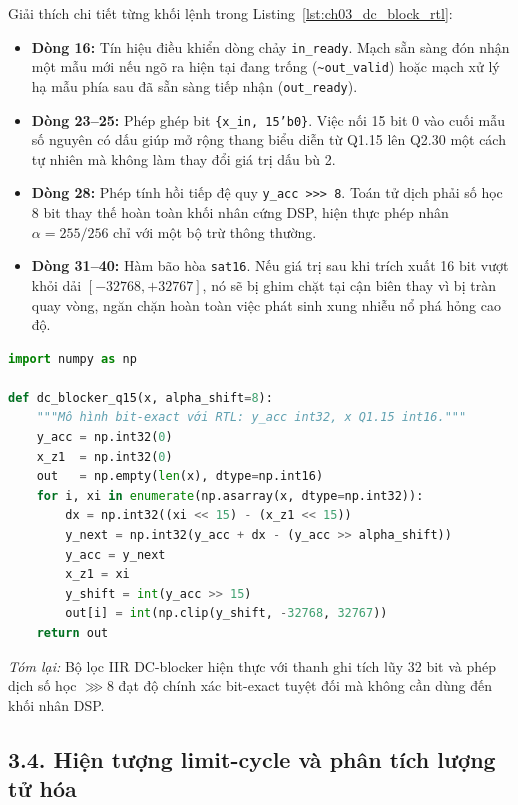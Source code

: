 Giải thích chi tiết từng khối lệnh trong Listing~\ref{lst:ch03_dc_block_rtl}:
\begin{itemize}
    \item \textbf{Dòng 16:} Tín hiệu điều khiển dòng chảy \texttt{in\_ready}. Mạch sẵn sàng đón nhận một mẫu mới nếu ngõ ra hiện tại đang trống (\texttt{\textasciitilde out\_valid}) hoặc mạch xử lý hạ mẫu phía sau đã sẵn sàng tiếp nhận (\texttt{out\_ready}).
    \item \textbf{Dòng 23--25:} Phép ghép bit \texttt{\{x\_in, 15'b0\}}. Việc nối 15 bit 0 vào cuối mẫu số nguyên có dấu giúp mở rộng thang biểu diễn từ Q1.15 lên Q2.30 một cách tự nhiên mà không làm thay đổi giá trị dấu bù 2.
    \item \textbf{Dòng 28:} Phép tính hồi tiếp đệ quy \texttt{y\_acc >>> 8}. Toán tử dịch phải số học 8 bit thay thế hoàn toàn khối nhân cứng DSP, hiện thực phép nhân $\alpha = 255/256$ chỉ với một bộ trừ thông thường.
    \item \textbf{Dòng 31--40:} Hàm bão hòa \texttt{sat16}. Nếu giá trị sau khi trích xuất 16 bit vượt khỏi dải $[-32768, +32767]$, nó sẽ bị ghim chặt tại cận biên thay vì bị tràn quay vòng, ngăn chặn hoàn toàn việc phát sinh xung nhiễu nổ phá hỏng cao độ.
\end{itemize}

\begin{lstlisting}[language=Python, caption={Mô hình Python song sinh bit-exact cho bộ lọc DC-blocker \texttt{dc\_blocker\_q15}.}, label={lst:ch03_dc_block_twin}]
import numpy as np

def dc_blocker_q15(x, alpha_shift=8):
    """Mô hình bit-exact với RTL: y_acc int32, x Q1.15 int16."""
    y_acc = np.int32(0)
    x_z1  = np.int32(0)
    out   = np.empty(len(x), dtype=np.int16)
    for i, xi in enumerate(np.asarray(x, dtype=np.int32)):
        dx = np.int32((xi << 15) - (x_z1 << 15))
        y_next = np.int32(y_acc + dx - (y_acc >> alpha_shift))
        y_acc = y_next
        x_z1 = xi
        y_shift = int(y_acc >> 15)
        out[i] = int(np.clip(y_shift, -32768, 32767))
    return out
\end{lstlisting}

\textit{Tóm lại:} Bộ lọc IIR DC-blocker hiện thực với thanh ghi tích lũy 32 bit và phép dịch số học $\ggg 8$ đạt độ chính xác bit-exact tuyệt đối mà không cần dùng đến khối nhân DSP.

\subsection*{3.4. Hiện tượng limit-cycle và phân tích lượng tử hóa}

